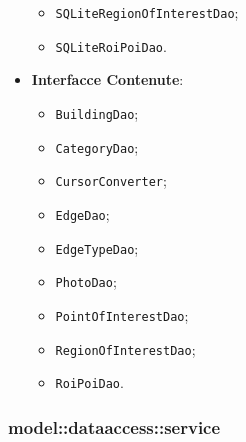 \documentclass[../DefinizioneDiProdotto.tex]{subfiles}
\begin{document}
\begin{itemize}
\begin{itemize}
		\item \texttt{SQLiteRegionOfInterestDao};
		
		\item \texttt{SQLiteRoiPoiDao}.
		
	\end{itemize}
	\item \textbf{Interfacce Contenute}:
	\begin{itemize}
		\item \texttt{BuildingDao};
		
		\item \texttt{CategoryDao};
		
		\item \texttt{CursorConverter};
		
		\item \texttt{EdgeDao};
		
		\item \texttt{EdgeTypeDao};
		
		\item \texttt{PhotoDao};
		
		\item \texttt{PointOfInterestDao};
		
		\item \texttt{RegionOfInterestDao};
		
		\item \texttt{RoiPoiDao}.
		
	\end{itemize}
\end{itemize}

\subsubsection{model::\-dataaccess::\-service}
\end{document}
